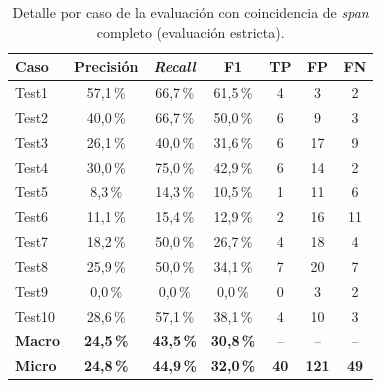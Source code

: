 \begin{table}[htbp]
    \centering
    \caption{Detalle por caso de la evaluación  con coincidencia de \textit{span}
    completo (evaluación estricta).}
    \label{tab:ner_detalle_estricta}
    \begin{tabular}{@{}lcccccc@{}}
    \toprule
    \textbf{Caso} & \textbf{Precisión} & \textbf{\textit{Recall}} & \textbf{F1} & \textbf{TP} & \textbf{FP} & \textbf{FN} \\
    \midrule
    Test1  & 57,1\,\% & 66,7\,\% & 61,5\,\% & 4 & 3  & 2 \\
    Test2  & 40,0\,\% & 66,7\,\% & 50,0\,\% & 6 & 9  & 3 \\
    Test3  & 26,1\,\% & 40,0\,\% & 31,6\,\% & 6 & 17 & 9 \\
    Test4  & 30,0\,\% & 75,0\,\% & 42,9\,\% & 6 & 14 & 2 \\
    Test5  & 8,3\,\%  & 14,3\,\% & 10,5\,\% & 1 & 11 & 6 \\
    Test6  & 11,1\,\% & 15,4\,\% & 12,9\,\% & 2 & 16 & 11 \\
    Test7  & 18,2\,\% & 50,0\,\% & 26,7\,\% & 4 & 18 & 4 \\
    Test8  & 25,9\,\% & 50,0\,\% & 34,1\,\% & 7 & 20 & 7 \\
    Test9  & 0,0\,\%  & 0,0\,\%  & 0,0\,\%  & 0 & 3  & 2 \\
    Test10 & 28,6\,\% & 57,1\,\% & 38,1\,\% & 4 & 10 & 3 \\
    \midrule
    \textbf{Macro} & \textbf{24,5\,\%} & \textbf{43,5\,\%} & \textbf{30,8\,\%} & -- & -- & -- \\
    \textbf{Micro} & \textbf{24,8\,\%} & \textbf{44,9\,\%} & \textbf{32,0\,\%} & \textbf{40} & \textbf{121} & \textbf{49} \\
    \bottomrule
    \end{tabular}
\end{table}
